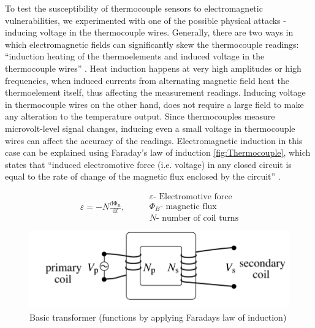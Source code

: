 To test the susceptibility of thermocouple sensors to electromagnetic vulnerabilities, we experimented with one of the possible physical attacks - inducing voltage in the thermocouple wires. Generally, there are two ways in which electromagnetic fields can significantly skew the thermocouple readings: ``induction heating of the thermoelements and induced voltage in the thermocouple wires'' \cite{Omega17}. Heat induction happens at very high amplitudes or high frequencies, when induced currents from alternating magnetic field heat the thermoelement itself, thus affecting the measurement readings. Inducing voltage in thermocouple wires on the other hand, does not require a large field to make any alteration to the temperature output. Since thermocouples measure microvolt-level signal changes, inducing even a small voltage in thermocouple wires can affect the accuracy of the readings. Electromagnetic induction in this case can be explained using Faraday's law of induction \cref{fig:Thermocouple}, which states that ``induced electromotive force (i.e. voltage) in any closed circuit is equal to the rate of change of the magnetic flux enclosed by the circuit'' \cite{Jordan68}. 

\begin{equation}
\begin{split}
\varepsilon = - N\frac{\mathrm{d\Phi _{B}} }{\mathrm{d} t},
\end{split}
\qquad
\begin{split}
\varepsilon \text{- Electromotive force}\\
{\Phi _{B}} \text{- magnetic flux}\\
N \text{- number of coil turns}
\end{split}
\end{equation}

\begin{figure}[h]
    \centering
    \includegraphics[width=\linewidth]{pictures/FLaw.png}
    \caption{Basic transformer (functions by applying Faraday\textquotesingle s law of induction) \cite{Flap96}}
    \label{fig:Transformer}
\end{figure}


